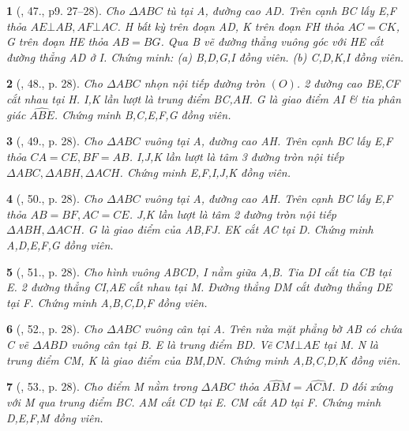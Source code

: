 \documentclass{article}
\newtheorem{baitoan}{}
\begin{document}
\begin{baitoan}[\cite{Thu_Chung_Viet_Minh_circ}, 47., p9. 27--28]
	Cho $\Delta ABC$ tù tại A, đường cao AD. Trên cạnh BC lấy E,F thỏa $AE\bot AB,AF\bot AC$. H bất kỳ trên đoạn AD, K trên đoạn FH thỏa $AC = CK$, G trên đoạn HE thỏa $AB = BG$. Qua B vẽ đường thẳng vuông góc với HE cắt đường thẳng AD ở I. Chứng minh: (a) B,D,G,I đồng viên. (b) C,D,K,I đồng viên.
\end{baitoan}

\begin{baitoan}[\cite{Thu_Chung_Viet_Minh_circ}, 48., p. 28]
	Cho $\Delta ABC$ nhọn nội tiếp đường tròn $(O)$. 2 đường cao BE,CF cắt nhau tại H. I,K lần lượt là trung điểm BC,AH. G là giao điểm AI \& tia phân giác $\widehat{ABE}$. Chứng minh B,C,E,F,G đồng viên.
\end{baitoan}

\begin{baitoan}[\cite{Thu_Chung_Viet_Minh_circ}, 49., p. 28]
	Cho $\Delta ABC$ vuông tại A, đường cao AH. Trên cạnh BC lấy E,F thỏa $CA = CE,BF = AB$. I,J,K lần lượt là tâm 3 đường tròn nội tiếp $\Delta ABC,\Delta ABH,\Delta ACH$. Chứng minh E,F,I,J,K đồng viên.
\end{baitoan}

\begin{baitoan}[\cite{Thu_Chung_Viet_Minh_circ}, 50., p. 28]
	Cho $\Delta ABC$ vuông tại A, đường cao AH. Trên cạnh BC lấy E,F thỏa $AB = BF,AC = CE$. J,K lần lượt là tâm 2 đường tròn nội tiếp $\Delta ABH,\Delta ACH$. G là giao điểm của AB,FJ. EK cắt AC tại D. Chứng minh A,D,E,F,G đồng viên.
\end{baitoan}

\begin{baitoan}[\cite{Thu_Chung_Viet_Minh_circ}, 51., p. 28]
	Cho hình vuông ABCD, I nằm giữa A,B. Tia DI cắt tia CB tại E. 2 đường thẳng CI,AE cắt nhau tại M. Đường thẳng DM cắt đường thẳng DE tại F. Chứng minh A,B,C,D,F đồng viên.
\end{baitoan}

\begin{baitoan}[\cite{Thu_Chung_Viet_Minh_circ}, 52., p. 28]
	Cho $\Delta ABC$ vuông cân tại A. Trên nửa mặt phẳng bờ AB có chứa C vẽ $\Delta ABD$ vuông cân tại B. E là trung điểm BD. Vẽ $CM\bot AE$ tại M. N là trung điểm CM, K là giao điểm của BM,DN. Chứng minh A,B,C,D,K đồng viên.
\end{baitoan}

\begin{baitoan}[\cite{Thu_Chung_Viet_Minh_circ}, 53., p. 28]
	Cho điểm M nằm trong $\Delta ABC$ thỏa $\widehat{ABM} = \widehat{ACM}$. D đối xứng với M qua trung điểm BC. AM cắt CD tại E. CM cắt AD tại F. Chứng minh D,E,F,M đồng viên.
\end{baitoan}
\end{document}
